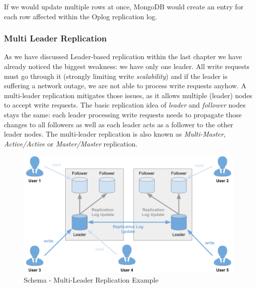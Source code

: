 {If we would update multiple rows at once, MongoDB would create an entry for each row affected within the Oplog replication log.

\newpage
\subsubsection{Multi Leader Replication}
\label{tf_dds_replication_multi_leader}
As we have discussed Leader-based replication within the last chapter we have already noticed the biggest weakness: we have only one leader. All write requests must go through it (strongly limiting write \textit{scalability}) and if the leader is suffering a network outage, we are not able to process write requests anyhow. A multi-leader replication  mitigates those issues, as it allows multiple (leader) nodes to accept write requests. The basic replication idea of \textit{leader} and \textit{follower} nodes stays the same: each leader processing write requests needs to propagate those changes to all followers as well as each leader acts as a follower to the other leader nodes. The multi-leader replication is also known as \textit{Multi-Master}, \textit{Active/Active} or \textit{Master/Master} replication.

\begin{figure}[h]
	\centering
  \includegraphics[width=1\textwidth]{replication_schema_ml_replication.png}
	\caption{Schema - Multi-Leader Replication Example}
	\label{schema_replication_ml_replication}
\end{figure}

}
